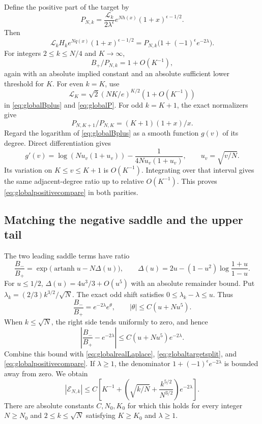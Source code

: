 Define the positive part of the target by
\begin{equation}\label{eq:globalP}
P_{N,k}=\frac{\mathcal L_k}{2\lambda^\epsilon}
e^{Nh(x)}(1+x)^{\epsilon-1/2}.
\end{equation}
Then
\begin{equation}\label{eq:globaltargetsplit}
\mathcal L_kH_ke^{Nq(x)}(1+x)^{\epsilon-1/2}
=P_{N,k}\bigl(1+(-1)^\epsilon e^{-2\lambda}\bigr).
\end{equation}
For integers $2\le k\le N/4$ and $K\to\infty$,
\begin{equation}\label{eq:globalpositivecompare}
B_+/P_{N,k}=1+O(K^{-1}),
\end{equation}
again with an absolute implied constant and an absolute sufficient lower threshold for $K$. For even $k=K$, use
\[
\mathcal L_K=\sqrt2(NK/e)^{K/2}(1+O(K^{-1}))
\]
in \eqref{eq:globalBplus} and \eqref{eq:globalP}. For odd $k=K+1$, the exact normalizers give
\[
P_{N,K+1}/P_{N,K}=(K+1)(1+x)/x.
\]
Regard the logarithm of \eqref{eq:globalBplus} as a smooth function $g(v)$ of its degree. Direct differentiation gives
\[
g'(v)=\log(Nu_v(1+u_v))-\frac1{4Nu_v(1+u_v)},
\qquad u_v=\sqrt{v/N}.
\]
Its variation on $K\le v\le K+1$ is $O(K^{-1})$. Integrating over that interval gives the same adjacent-degree ratio up to relative $O(K^{-1})$. This proves \eqref{eq:globalpositivecompare} in both parities.

\subsection{Matching the negative saddle and the upper tail}

The two leading saddle terms have ratio
\begin{equation}\label{eq:globalnegativeratio}
\frac{B_-}{B_+}
=\exp\bigl(\operatorname{artanh}u-N\Delta(u)\bigr),
\qquad
\Delta(u)=2u-(1-u^2)\log\frac{1+u}{1-u}.
\end{equation}
For $u\le1/2$, $\Delta(u)=4u^3/3+O(u^5)$ with an absolute remainder bound. Put $\lambda_k=(2/3)k^{3/2}/\sqrt N$. The exact odd shift satisfies $0\le\lambda_k-\lambda\le u$. Thus
\[
\frac{B_-}{B_+}=e^{-2\lambda}e^\theta,
\qquad |\theta|\le C(u+Nu^5).
\]
When $k\le\sqrt N$, the right side tends uniformly to zero, and hence
\[
\left|\frac{B_-}{B_+}-e^{-2\lambda}\right|
\le C(u+Nu^5)e^{-2\lambda}.
\]
Combine this bound with \eqref{eq:globalrealLaplace}, \eqref{eq:globaltargetsplit}, and \eqref{eq:globalpositivecompare}. If $\lambda\ge1$, the denominator $1+(-1)^\epsilon e^{-2\lambda}$ is bounded away from zero. We obtain
\begin{equation}\label{eq:globalmiddlebound}
|\mathcal E_{N,k}|\le C\left[
K^{-1}+\left(\sqrt{k/N}+\frac{k^{5/2}}{N^{3/2}}\right)e^{-2\lambda}\right].
\end{equation}
There are absolute constants $C,N_0,K_0$ for which this holds for every integer $N\ge N_0$ and $2\le k\le\sqrt N$ satisfying $K\ge K_0$ and $\lambda\ge1$.


